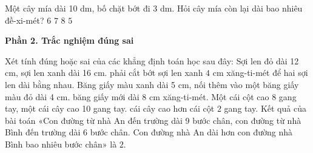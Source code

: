 \begin{ex} %
Một cây mía dài 10 dm, bố chặt bớt đi 3 dm. Hỏi cây mía còn lại dài bao nhiêu đề-xi-mét?
\choice
{$6$}
{\True $7$}
{$8$}
{$5$}
\end{ex}

\textbf{Phần 2. Trắc nghiệm đúng sai}

\begin{ex} %
Xét tính đúng hoặc sai của các khẳng định toán học sau đây:
\choiceTF
{\True Sợi len đỏ dài 12 cm, sợi len xanh dài 16 cm. phải cắt bớt sợi len xanh $4\text{ cm}$ xăng-ti-mét để hai sợi len dài bằng nhau.}
{Băng giấy màu xanh dài 5 cm, nối thêm vào một băng giấy màu đỏ dài 4 cm. băng giấy mới dài $8\text{ cm}$ xăng-ti-mét.}
{\True Một cái cột cao 8 gang tay, một cái cây cao 10 gang tay. cái cây cao hơn cái cột $2$ gang tay.}
{Kết quả của bài toán «Con đường từ nhà An đến trường dài 9 bước chân, con đường từ nhà Bình đến trường dài 6 bước chân. Con đường nhà An dài hơn con đường nhà Bình bao nhiêu bước chân» là $2$.}
\end{ex}

